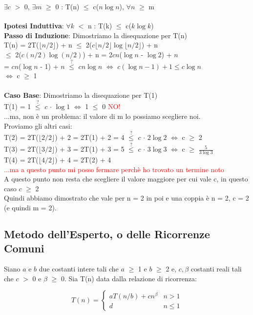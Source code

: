 \documentclass[../cheatSheetAlgoritmi.tex]{subfiles}
\begin{document}
$\exists c$ $>$ 0, $\exists m$ $\geq$ 0 : T(n) $\leq$ c($n\log{n}$), $\forall n$ $\geq$ m\\\\
\textbf{Ipotesi Induttiva}: $\forall k$ $<$ n : T(k) $\leq$ c($k\log{k}$)\\
\textbf{Passo di Induzione}: Dimostriamo la disequazione per T(n)\\
T(n) = 2T($\lfloor n/2 \rfloor$) + n $\leq$ 2($c \lfloor n/2 \rfloor \log{\lfloor n/2 \rfloor}$) + n\\
$\leq$ 2($c(n/2) \log{(n/2)}$) + n = 2$cn$($\log{n}$ - $\log{2}$) + $n$\\
= $cn$($\log{n}$ - 1) + $n$ $\stackrel{?}{\leq}$ $cn\log{n}$ $\iff$ $c(\log{n}-1) + 1 \leq c \log{n}$\\
$\iff$ c $\geq$ 1\\\\
\textbf{Caso Base}: Dimostriamo la disequazione per T(1)\\
T(1) = 1 $\stackrel{?}{\leq}$ $c$ $\cdot$ $\log{1}$ $\iff$ 1 $\leq$ 0 \textcolor{red}{NO!}\\
...ma, non è un problema: il valore di m lo possiamo scegliere noi.\\
Proviamo gli altri casi:\\
T(2) = 2T($\lfloor 2/2 \rfloor$) + 2 = 2T(1) + 2 = 4 $\stackrel{?}{\leq}$ $c$ $\cdot$ $2 \log{2}$ $\iff$ c $\geq$ 2\\
T(3) = 2T($\lfloor 3/2 \rfloor$) + 3 = 2T(1) + 3 = 5 $\stackrel{?}{\leq}$ $c$ $\cdot$ $3 \log{3}$ $\iff$ c $\geq$ $\frac{5}{3 \log{3}}$\\
T(4) = 2T($\lfloor 4/2 \rfloor$) + 4 = 2T(2) + 4\\
\textcolor{red}{...ma a questo punto mi posso fermare perchè ho trovato un termine noto}\\
A questo punto non resta che scegliere il valore maggiore per cui vale c, in questo caso $c$ $\geq$ 2\\
Quindi abbiamo dimostrato che vale per n = 2 in poi e una coppia è n = 2, c = 2 (e quindi m = 2).\\

\subsection{Metodo dell'Esperto, o delle Ricorrenze Comuni}
Siano $a$ e $b$ due costanti intere tali che $a$ $\geq$ 1 e $b$ $\geq$ 2 e, $c, \beta$ costanti reali tali che $c$ $>$ 0 e $\beta$ $\geq$ 0. Sia T(n) data dalla relazione di ricorrenza:
\begin{center}
	\begin{equation*}
  		T(n)=\begin{cases}
    		aT(n/b) + cn^{\beta} & \text{$n > 1$}\\
    		d & \text{$n \leq 1$}
  		\end{cases}	
	\end{equation*}
\end{center}
\end{document}
